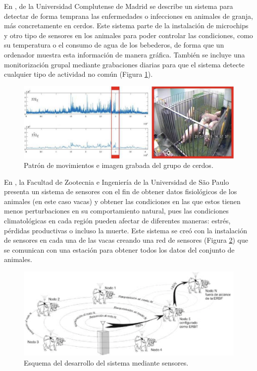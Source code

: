 En \cite{ucm}, de la Universidad Complutense de Madrid se describe un sistema para detectar de forma temprana las enfermedades o infecciones en animales de granja, más concretamente en cerdos. Este sistema parte de la instalación de microchips y otro tipo de sensores en los animales para poder controlar las condiciones, como su temperatura o el consumo de agua de los bebederos, de forma que un ordenador muestra esta información de manera gráfica. También se incluye una monitorización grupal mediante grabaciones diarias para que el sistema detecte cualquier tipo de actividad no común (Figura \ref{fig:ucm}).\\
\begin{figure} [h!]
  \begin{center}
    \includegraphics[width=14cm]{figs/ucm}
  \end{center}
  \caption{Patrón de movimientos e imagen grabada del grupo de cerdos.}
  \label{fig:ucm}
\end{figure}

En \cite{arce09}, la Facultad de Zootecnia e Ingeniería de la Universidad de São Paulo presenta un sistema de sensores con el fin de obtener datos fisiológicos de los animales (en este caso vacas) y obtener las condiciones en las que estos tienen menos perturbaciones en su comportamiento natural, pues las condiciones climatológicas en cada región pueden afectar de diferentes maneras: estrés, pérdidas productivas o incluso la muerte. Este sistema se creó con la instalación de sensores en cada una de las vacas creando una red de sensores (Figura \ref{fig:saopaulo}) que se comunican con una estación para obtener todos los datos del conjunto de animales.\\
\begin{figure} [h!]
  \begin{center}
    \includegraphics[width=14cm]{figs/saopaulo}
  \end{center}
  \caption{Esquema del desarrollo del sistema mediante sensores.}
  \label{fig:saopaulo}
\end{figure}

